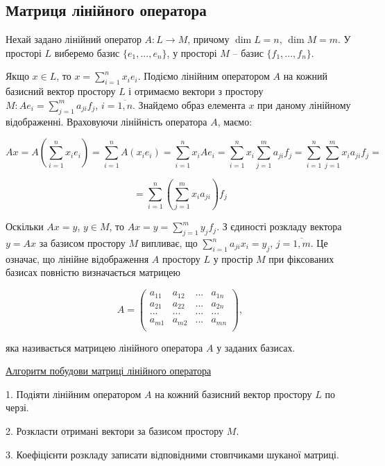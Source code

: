 \subsection{Матриця лінійного оператора}

Нехай задано лінійний оператор $A: L \rightarrow M$, причому $\dim L = n$, $\dim M = m$.
У просторі $L$ виберемо базис $\{e_1, ..., e_n\}$, у просторі $M$ -- базис $\{f_1, ..., f_n\}$.

Якщо $x \in L$, то $x = \sum\limits_{i=1}^n x_i e_i$. Подіємо лінійним оператором $A$ на кожний
базисний вектор простору $L$ і отримаємо вектори з простору $M: A e_i = \sum\limits_{j=1}^m a_{ji} f_j$,
$i = \overline{1,n}$. Знайдемо образ елемента $x$ при даному лінійному відображенні.
Враховуючи лінійність оператора $A$, маємо:

$$A x = A\left( \sum\limits_{i=1}^n x_i e_i \right)
= \sum\limits_{i=1}^n A(x_i e_i) = \sum\limits_{i=1}^n x_i A e_i
= \sum\limits_{i=1}^n x_i \sum\limits_{j=1}^m a_{ji} f_j
= \sum\limits_{i=1}^n\sum\limits_{j=1}^m x_i a_{ji} f_j = $$

$$ = \sum\limits_{i=1}^n \left( \sum\limits_{j=1}^m x_i a_{ji} \right) f_j$$

Оскільки $Ax = y$, $y \in M$, то $A x = y = \sum\limits_{j=1}^m y_j f_j$. З єдиності розкладу вектора
$y = A x$ за базисом простору $M$ випливає, що $\sum\limits_{i=1}^n a_{ji} x_i = y_j$, $j = \overline{1,m}$.
Це означає, що лінійне відображення $A$ простору $L$ у простір $M$ при фіксованих базисах
повністю визначається матрицею

$$A = \begin{pmatrix}
	a_{11} & a_{12} & ... & a_{1n} \\
	a_{21} & a_{22} & ... & a_{2n} \\
	...    & ...    & ... & ...    \\
	a_{m1} & a_{m2} & ... & a_{mn} \\
\end{pmatrix},$$

яка називається матрицею лінійного оператора $A$ у заданих базисах.

\underline{Алгоритм побудови матриці лінійного оператора}

1. Подіяти лінійним оператором $A$ на кожний базисний вектор простору $L$ по
черзі.

2. Розкласти отримані вектори за базисом простору $M$.

3. Коефіцієнти розкладу записати відповідними стовпчиками шуканої матриці.


